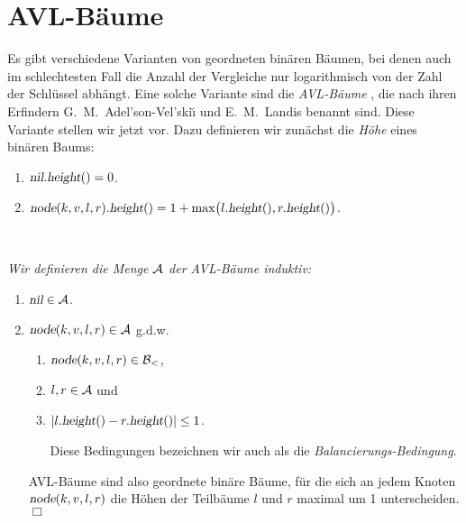
\section{AVL-B\"aume}
Es gibt verschiedene Varianten von geordneten bin\"aren B\"aumen, bei denen auch im
schlechtesten Fall die Anzahl der Vergleiche nur logarithmisch von der Zahl der Schl\"ussel
abh\"angt.  Eine solche Variante sind die \emph{AVL-B\"aume} \cite{adelson:62}, die nach ihren Erfindern
G.~M.~Adel'son-Vel'ski\u{\i} und E.~M.~Landis benannt sind.  Diese Variante stellen wir jetzt vor.
Dazu definieren wir zun\"achst die \emph{H\"ohe} eines bin\"aren Baums:
\begin{enumerate}
\item $\textsl{nil}.\textsl{height}() = 0$.
\item $\textsl{node}(k,v,l,r).\textsl{height}() = 1 + \max\bigl( l.\textsl{height}(), r.\textsl{height}() \bigr)$.
\end{enumerate}

\begin{Definition} \hspace*{\fill} \\
{\em 
  Wir definieren die Menge $\mathcal{A}$ der \emph{AVL-B\"aume} induktiv:
  \begin{enumerate}
  \item $\textsl{nil} \in \mathcal{A}$.
  \item $\textsl{node}(k,v,l,r) \in \mathcal{A}$ \quad g.d.w. 
        \begin{enumerate}
        \item $\textsl{node}(k,v,l,r) \in \mathcal{B}_<$,
        \item $l, r \in \mathcal{A}$ \quad und
        \item $|l.\textsl{height}() - r.\textsl{height}()| \leq 1$.

              Diese Bedingungen bezeichnen wir auch als die \emph{Balancierungs-Bedingung}.
        \end{enumerate}
        AVL-B\"aume sind also geordnete bin\"are B\"aume, f\"ur die sich an jedem Knoten
        $\textsl{node}(k,v,l,r)$ die H\"ohen der Teilb\"aume $l$ und $r$ maximal um 1
        unterscheiden.  \hspace*{\fill} $\Box$
  \end{enumerate}
}  
\end{Definition}



